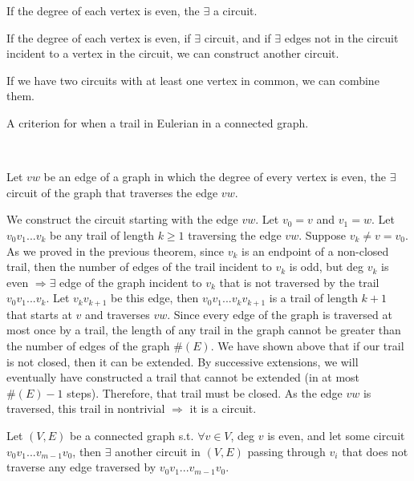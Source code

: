 \documentclass[10pt]{article}
\begin{document}
	\begin{description}
		\item[Lemma A:] If the degree of each vertex is even, the $\exists$ a circuit.
		\item[Lemma B:] If the degree of each vertex is even, if $\exists$ circuit, and if $\exists$ edges not in the circuit incident to a vertex in the circuit, we can construct another circuit.
		\item[Lemma C:] If we have two circuits with at least one vertex in common, we can combine them.
		\item[Lemma D:] A criterion for when a trail in Eulerian in a connected graph.
		\item ~\\
		\item[Lemma A:] Let $vw$ be an edge of a graph in which the degree of every vertex is even, the $\exists$ circuit of the graph that traverses the edge $vw$.
		\item[Proof:] We construct the circuit starting with the edge $vw$. Let $v_0 = v$ and $v_1 = w$. Let $v_0 v_1 ... v_k$ be any trail of length $k \geq 1$ traversing the edge $vw$. Suppose $v_k \neq v = v_0$. As we proved in the previous theorem, since $v_k$ is an endpoint of a non-closed trail, then the number of edges of the trail incident to $v_k$ is odd, but deg $v_k$ is even $\Rightarrow \exists$ edge of the graph incident to $v_k$ that is not traversed by the trail $v_0 v_1 ... v_k$. Let $v_k v_{k+1}$ be this edge, then $v_0 v_1 ... v_k v_{k+1}$ is a trail of length $k+1$ that starts at $v$ and traverses $vw$. Since every edge of the graph is traversed at most once by a trail, the length of any trail in the graph cannot be greater than the number of edges of the graph $\#(E)$. We have shown above that if our trail is not closed, then it can be extended. By successive extensions, we will eventually have constructed a trail that cannot be extended (in at most $\#(E)-1$ steps). Therefore, that trail must be closed. As the edge $vw$ is traversed, this trail in nontrivial $\Rightarrow$ it is a circuit.
		\item[qed]
		\item[Lemma B:] Let $(V, E)$ be a connected graph s.t. $\forall v \in V$, deg $v$ is even, and let some circuit $v_0 v_1 ... v_{m-1} v_0$, then $\exists$ another circuit in $(V, E)$ passing through $v_i$ that does not traverse any edge traversed by $v_0 v_1 ... v_{m-1} v_0$.

\end{description}
\end{document}
